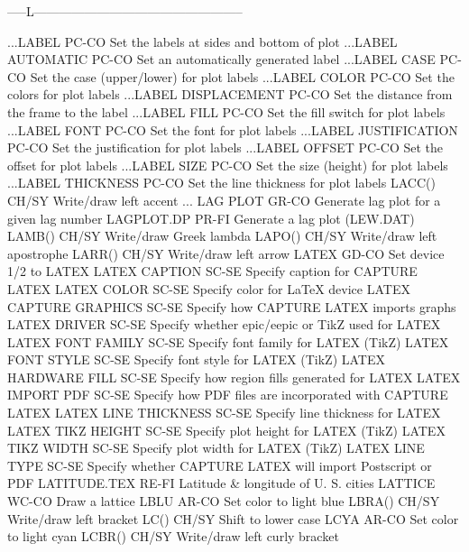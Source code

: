 -----L--------------------------------------------------

...LABEL                    PC-CO Set the labels at sides and bottom of plot
...LABEL AUTOMATIC          PC-CO Set an automatically generated label
...LABEL CASE               PC-CO Set the case (upper/lower) for plot labels
...LABEL COLOR              PC-CO Set the colors for plot labels
...LABEL DISPLACEMENT       PC-CO Set the distance from the frame to the label
...LABEL FILL               PC-CO Set the fill switch for plot labels
...LABEL FONT               PC-CO Set the font for plot labels
...LABEL JUSTIFICATION      PC-CO Set the justification for plot labels
...LABEL OFFSET             PC-CO Set the offset for plot labels
...LABEL SIZE               PC-CO Set the size (height) for plot labels
...LABEL THICKNESS          PC-CO Set the line thickness for plot labels
LACC()                      CH/SY Write/draw left accent
... LAG PLOT                GR-CO Generate lag plot for a given lag number
LAGPLOT.DP                  PR-FI Generate a lag plot (LEW.DAT)
LAMB()                      CH/SY Write/draw Greek lambda
LAPO()                      CH/SY Write/draw left apostrophe
LARR()                      CH/SY Write/draw left arrow
LATEX                       GD-CO Set device 1/2 to LATEX
LATEX CAPTION               SC-SE Specify caption for CAPTURE LATEX
LATEX COLOR                 SC-SE Specify color for LaTeX device
LATEX CAPTURE GRAPHICS      SC-SE Specify how CAPTURE LATEX imports graphs
LATEX DRIVER                SC-SE Specify whether epic/eepic or TikZ used for LATEX
LATEX FONT FAMILY           SC-SE Specify font family for LATEX (TikZ)
LATEX FONT STYLE            SC-SE Specify font style for LATEX (TikZ)
LATEX HARDWARE FILL         SC-SE Specify how region fills generated for LATEX
LATEX IMPORT PDF            SC-SE Specify how PDF files are incorporated with CAPTURE LATEX
LATEX LINE THICKNESS        SC-SE Specify line thickness for LATEX
LATEX TIKZ HEIGHT           SC-SE Specify plot height for LATEX (TikZ)
LATEX TIKZ WIDTH            SC-SE Specify plot width for LATEX (TikZ)
LATEX LINE TYPE             SC-SE Specify whether CAPTURE LATEX will import Postscript or PDF
LATITUDE.TEX                RE-FI Latitude & longitude of U. S. cities
LATTICE                     WC-CO Draw a lattice
LBLU                        AR-CO Set color to light blue
LBRA()                      CH/SY Write/draw left bracket
LC()                        CH/SY Shift to lower case
LCYA                        AR-CO Set color to light cyan
LCBR()                      CH/SY Write/draw left curly bracket
